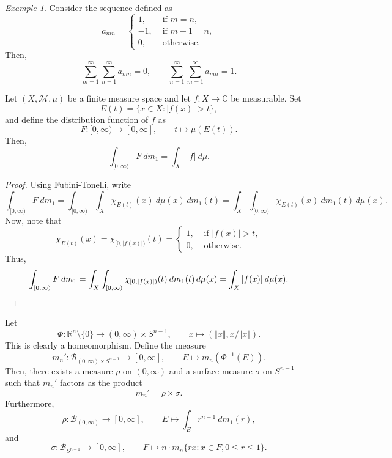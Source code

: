 \documentclass[11pt]{article}
\newcommand{\C}{\mathbb{C}}
\newcommand{\R}{\mathbb{R}}
\newcommand{\M}{\mathcal{M}}
\newcommand{\norm}[1]{\Vert #1 \Vert}
\theoremstyle{definition}
\theoremstyle{remark}
\newtheorem*{example}{Example}
\numberwithin{equation}{section}
\begin{document}
    \begin{example}
        Consider the sequence defined as \[
            a_{mn} = \begin{cases}
                1, &\text{ if } m = n, \\
                -1, &\text{ if } m + 1 = n, \\
                0, &\text{ otherwise}.
            \end{cases}
        \] Then, \[
            \sum_{m = 1}^\infty\sum_{n = 1}^\infty a_{mn} = 0, \qquad
            \sum_{n = 1}^\infty\sum_{m = 1}^\infty a_{mn} = 1.
        \]
    \end{example}


    \begin{theorem}
        Let $(X, \M, \mu)$ be a finite measure space and let $f\colon X \to \C$ be
        measurable. Set \[
            E(t) = \{x \in X: |f(x)| > t\},
        \] and define the distribution function of $f$ as \[
            F\colon [0, \infty) \to [0, \infty], \qquad t \mapsto \mu(E(t)).
        \] Then, \[
            \int_{[0, \infty)} F\:dm_1 = \int_X |f|\:d\mu.
        \]
    \end{theorem}
    \begin{proof}
        Using Fubini-Tonelli, write \[
            \int_{[0, \infty)} F\:dm_1 = \int_{[0, \infty)} \int_X
            \chi_{E(t)}(x)\:d\mu(x)\,dm_1(t) = \int_X \int_{[0, \infty)}
            \chi_{E(t)}(x)\:dm_1(t)\,d\mu(x).
        \] Now, note that \[
            \chi_{E(t)}(x) = \chi_{[0, |f(x)|)}(t) = \begin{cases}
                1, &\text{ if } |f(x)| > t, \\
                0, &\text{ otherwise}.
            \end{cases}
        \] Thus, \[
            \int_{[0, \infty)} F\:dm_1 = \int_{X}\int_{[0, \infty)} \chi_{[0,
            |f(x)|)}(t) \:dm_1(t)\,d\mu(x) = \int_X |f(x)|\:d\mu(x). \qedhere
        \]
    \end{proof}

    \begin{theorem}
        Let \[
            \Phi\colon \R^n\setminus\{0\} \to (0, \infty) \times S^{n - 1}, \qquad
            x \mapsto (\norm{x}, x / \norm{x}).
        \] This is clearly a homeomorphism. Define the measure \[
            m_n'\colon \mathcal{B}_{(0, \infty) \times S^{n - 1}} \to [0, \infty],
            \qquad E \mapsto m_n(\Phi^{-1}(E)).
        \] Then, there exists a measure $\rho$ on $(0, \infty)$ and a surface measure
        $\sigma$ on $S^{n - 1}$ such that $m_n'$ factors as the product \[
            m_n' = \rho \times \sigma.
        \] Furthermore, \[
            \rho\colon \mathcal{B}_{(0, \infty)}\to [0, \infty], \qquad
            E \mapsto \int_E r^{n - 1}\:dm_1(r),
        \] and \[
            \sigma\colon \mathcal{B}_{S^{n - 1}}\to [0, \infty], \qquad
            F \mapsto n\cdot m_n\{rx: x \in F, 0 \leq r \leq 1\}.
        \]
    \end{theorem}
\end{document}
